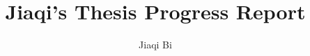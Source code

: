 \documentclass[preprint,12pt]{elsarticle}
\begin{document}
\begin{frontmatter}


\title{Jiaqi's Thesis Progress Report}




\author[rvt]{Jiaqi Bi}

\address[rvt]{Western University, \\ Schulich School of Medicine \& Dentistry, \\ Department of Epidemiology and Biostatistics}





\end{frontmatter}
\end{document}
